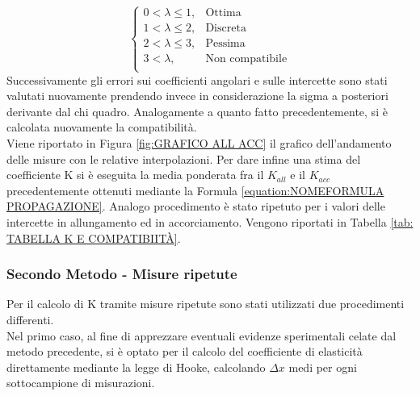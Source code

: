 \documentclass[a4paper,11pt,oneside]{article}
\begin{document}
\begin{equation*}%
    \label{eq:cases}
    \begin{cases}
    0<\lambda\leq 1, & \text{Ottima}\\
    1<\lambda\leq2, & \text{Discreta}\\
    2<\lambda\leq3, & \text{Pessima}\\
    3<\lambda, & \text{Non compatibile}\\
    \end{cases}
\end{equation*}
Successivamente gli errori sui coefficienti angolari e sulle intercette sono stati valutati nuovamente prendendo invece in considerazione la sigma a posteriori derivante dal chi quadro. Analogamente a quanto fatto precedentemente, si è calcolata nuovamente la compatibilità.\\
Viene riportato in Figura \ref{fig:GRAFICO ALL ACC} il grafico dell'andamento delle misure con le relative interpolazioni.
Per dare infine una stima del coefficiente K si è eseguita la media ponderata fra il $K_{all}$ e il $K_{acc}$ precedentemente ottenuti mediante la Formula \ref{equation:NOMEFORMULA PROPAGAZIONE}. Analogo procedimento è stato ripetuto per i valori delle intercette in allungamento ed in accorciamento. Vengono riportati in Tabella \ref{tab: TABELLA K E COMPATIBIITÀ}.

\subsubsection*{Secondo Metodo - Misure ripetute}
Per il calcolo di K tramite misure ripetute sono stati utilizzati due procedimenti differenti.\\
Nel primo caso, al fine di apprezzare eventuali evidenze sperimentali celate dal metodo precedente, si è optato per il calcolo del coefficiente di elasticità direttamente mediante la legge di Hooke, calcolando $\Delta x$ medi per ogni sottocampione di misurazioni.\\ 
\end{document}
